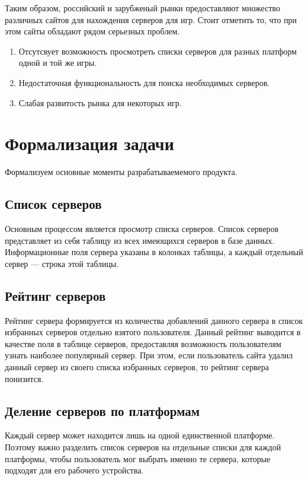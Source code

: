 Таким образом, российский и зарубженый рынки предоставляют множество различных сайтов для нахождения серверов для игр. Стоит отметить то, что при этом сайты обладают рядом серьезных проблем.

\begin{enumerate}
    \item Отсутсвует возможность просмотреть списки серверов для разных платформ одной и той же игры.
    \item Недостаточная функциональность для поиска необходимых серверов.
    \item Слабая развитость рынка для некоторых игр.
\end{enumerate}


\section{Формализация задачи}

Формализуем основные моменты разрабатываемемого продукта.

\subsection{Список серверов}

Основным процессом является просмотр списка серверов. Список серверов представляет из себя таблицу из всех имеющихся серверов в базе данных. Информационные поля сервера указаны в колонках таблицы, а каждый отдельный сервер --- строка этой таблицы.


\subsection{Рейтинг серверов}

Рейтинг сервера формируется из количества добавлений данного сервера в список избранных серверов отдельно взятого пользователя. Данный рейтинг выводится в качестве поля в таблице серверов, предоставляя возможность пользователям узнать наиболее популярный сервер. При этом, если пользователь сайта удалил данный сервер из своего списка избранных серверов, то рейтинг сервера понизится.


\subsection{Деление серверов по платформам}

Каждый сервер может находится лишь на одной единственной платформе. Поэтому важно разделить список серверов на отдельные списки для каждой платформы, чтобы пользователь мог выбрать именно те сервера, которые подходят для его рабочего устройства.


